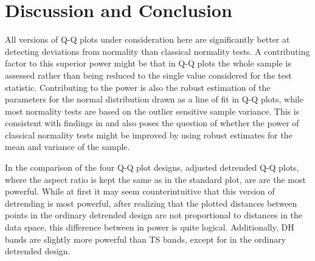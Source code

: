 \documentclass[12pt]{article}\usepackage[]{graphicx}\usepackage[]{color}
\begin{document}
\section{Discussion and Conclusion}\label{sec:discussion}

All versions of Q-Q plots under consideration here are significantly better at detecting deviations from normality than classical normality tests. A contributing factor to this superior power might be  that in  Q-Q plots the whole sample is assessed rather than being reduced to the single value considered for the test statistic. 
Contributing to the power is also the robust estimation of the parameters for the normal distribution drawn as a line of fit in  Q-Q plots, while most normality tests are based on the outlier sensitive sample variance. %
This is consistent with findings in \citet{buja:2013} and  also poses the question of whether the power of classical normality tests might  be improved by using robust estimates for the mean and variance of the sample. 

In the comparison of the four Q-Q plot designs, adjusted detrended Q-Q plots, where the aspect ratio is kept the same as in the standard plot, are are the most powerful. While at first it may seem counterintuitive that this version of detrending is most powerful, after realizing that the plotted distances between points in the ordinary detrended design are not proportional to distances in the data space, this difference between in power is quite logical. Additionally, DH bands are slightly more powerful than TS bands, except for in the ordinary detrended design.
\end{document}
